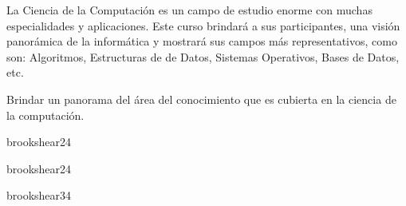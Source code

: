 \begin{syllabus}


\begin{justification}
La Ciencia de la Computación es un campo de estudio enorme con muchas especialidades y aplicaciones. Este curso brindará a sus participantes, una visión panorámica de la informática y mostrará sus campos más representativos, como son: Algoritmos, Estructuras de de Datos, Sistemas Operativos, Bases de Datos, etc.
\end{justification}

\begin{goals}
\item Brindar un panorama del área del conocimiento que es cubierta en la ciencia de la computación.
\end{goals}

\begin{outcomes}
\end{outcomes}

\begin{unit}{\DSBasicLogicDef}{brookshear}{2}{4}
    \DSBasicLogicAllTopics
    \DSBasicLogicAllObjectives
\end{unit}

\begin{unit}{\PFFundamentalConstructsDef}{brookshear}{2}{4}
   \begin{topics}
      \item \PFFundamentalConstructsTopicSyntax
      \item \PFFundamentalConstructsTopicVariables
      \item \PFFundamentalConstructsTopicStructured
   \end{topics}

   \begin{learningoutcomes}
      \item \PFFundamentalConstructsObjONE
   \end{learningoutcomes}
\end{unit}

\begin{unit}{\PFAlgorithmsAndProblemSolvingDef}{brookshear}{3}{4}
    \PFAlgorithmsAndProblemSolvingAllTopics
    \PFAlgorithmsAndProblemSolvingAllObjectives
\end{unit}


\end{syllabus}
